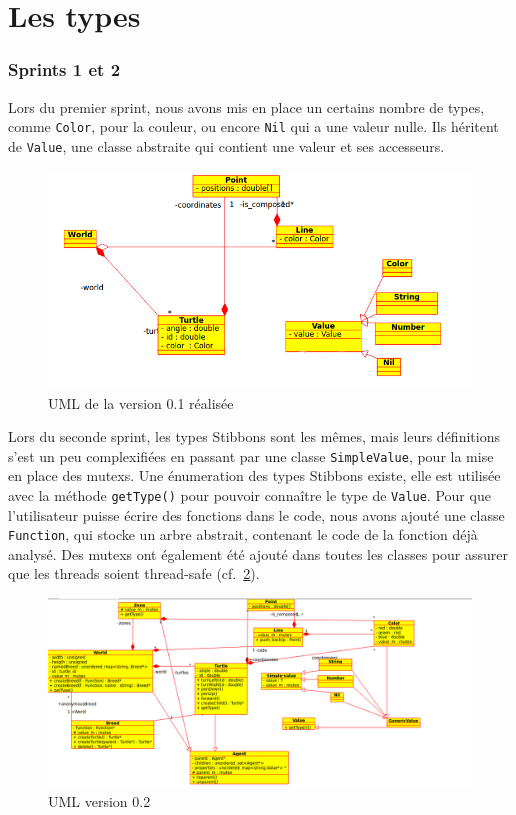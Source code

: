 \section{Les types}
\subsubsection{Sprints 1 et 2}
Lors du premier sprint, nous avons mis en place un certains nombre de types, comme \verb|Color|, pour la couleur, ou encore \verb|Nil| qui a une valeur nulle. Ils héritent de \verb|Value|, une classe abstraite qui contient une valeur et ses accesseurs.

\begin{figure}[h]
\includegraphics[scale=0.5]{doc/report/uml/v01reel.png}
\caption{\label{v0.1R} UML de la version 0.1 réalisée}
\end{figure}

Lors du seconde sprint, les types Stibbons sont les mêmes, mais leurs définitions s'est un peu complexifiées en passant par une classe \verb|SimpleValue|, pour la mise en place des mutexs. Une énumeration des types Stibbons existe, elle est utilisée avec la méthode \verb|getType()| pour pouvoir connaître le type de \verb|Value|.
Pour que l'utilisateur puisse écrire des fonctions dans le code, nous avons ajouté une classe \verb|Function|, qui stocke un arbre abstrait, contenant le code de la fonction déjà analysé.
Des mutexs ont également été ajouté dans toutes les classes pour assurer que les threads soient thread-safe (cf.~\ref{v0.2}).

\begin{figure}[h]
\includegraphics[scale=0.45]{doc/report/uml/v02.png}
\caption{\label{v0.2} UML version 0.2}
\end{figure}
